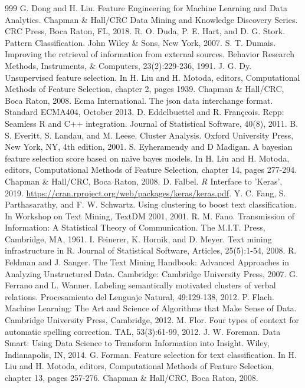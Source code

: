 \documentclass[11pt,openany,executivepaper]{book}
\begin{document}
\begin{thebibliography}{999}
 G. Dong and H. Liu. Feature Engineering for Machine Learning and Data Analytics. Chapman \& Hall/CRC Data Mining and Knowledge Discovery Series. CRC Press, Boca Raton, FL, 2018.
 R. O. Duda, P. E. Hart, and D. G. Stork. Pattern Classification. John Wiley \& Sons, New York, 2007.
 S. T. Dumais. Improving the retrieval of information from external sources. Behavior Research Methods, Instruments, \& Computers, 23(2):229-236, 1991.
 J. G. Dy. Unsupervised feature selection. In H. Liu and H. Motoda, editors, Computational Methods of Feature Selection, chapter 2, pages 1939. Chapman \& Hall/CRC, Boca Raton, 2008.
 Ecma International. The json data interchange format. Standard ECMA404, October 2013.
 D. Eddelbuettel and R. Françcois. Rcpp: Seamless R and C++ integration. Journal of Statistical Software, 40(8), 2011.
 B. S. Everitt, S. Landau, and M. Leese. Cluster Analysis. Oxford University Press, New York, NY, 4th edition, 2001.
 S. Eyheramendy and D Madigan. A bayesian feature selection score based on naïve bayes models. In H. Liu and H. Motoda, editors, Computational Methods of Feature Selection, chapter 14, pages 277-294. Chapman \& Hall/CRC, Boca Raton, 2008.
 D. Falbel. $R$ Interface to 'Keras', 2019. \url{https://cran.rproject.org/web/packages/keras/keras.pdf}.
 Y. C. Fang, S. Parthasarathy, and F. W. Schwartz. Using clustering to boost text classification. In Workshop on Text Mining, TextDM 2001, 2001.
 R. M. Fano. Transmission of Information: A Statistical Theory of Communication. The M.I.T. Press, Cambridge, MA, 1961.
 I. Feinerer, K. Hornik, and D. Meyer. Text mining infrastructure in R. Journal of Statistical Software, Articles, 25(5):1-54, 2008.
 R. Feldman and J. Sanger. The Text Mining Handbook: Advanced Approaches in Analyzing Unstructured Data. Cambridge: Cambridge University Press, 2007.
 G. Ferrano and L. Wanner. Labeling semantically motivated clusters of verbal relations. Procesamiento del Lenguaje Natural, 49:129-138, 2012.
 P. Flach. Machine Learning: The Art and Science of Algorithms that Make Sense of Data. Cambridge University Press, Cambridge, 2012.
 M. Flor. Four types of context for automatic spelling correction. TAL, 53(3):61-99, 2012.
 J. W. Foreman. Data Smart: Using Data Science to Transform Information into Insight. Wiley, Indianapolis, IN, 2014.
 G. Forman. Feature selection for text classification. In H. Liu and H. Motoda, editors, Computational Methods of Feature Selection, chapter 13, pages 257-276. Chapman \& Hall/CRC, Boca Raton, 2008.

\end{thebibliography}
\end{document}
